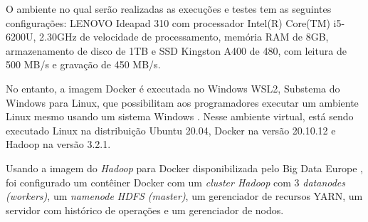 O ambiente no qual serão realizadas as execuções e testes tem as seguintes configurações: LENOVO Ideapad 310 com processador Intel(R) Core(TM) i5-6200U, 2.30GHz de velocidade de processamento,  memória RAM de 8GB, armazenamento de disco de 1TB e SSD Kingston A400 de 480, com leitura de 500 MB/s e gravação de 450 MB/s. 

No entanto, a imagem Docker é executada no Windows WSL2, Substema do Windows para Linux, que possibilitam aos programadores executar um ambiente Linux mesmo usando um sistema Windows \cite{MicrosoftWSL22}. Nesse ambiente virtual, está sendo executado Linux na distribuição Ubuntu 20.04, Docker na versão 20.10.12 e Hadoop na versão 3.2.1.

Usando a imagem do \textit{Hadoop} para Docker disponibilizada pelo Big Data Europe \cite{BigDataHadoopGithub}, foi configurado um contêiner Docker com um \textit{cluster Hadoop} com 3 \textit{datanodes (workers)}, um \textit{namenode HDFS (master)}, um gerenciador de recursos YARN, um servidor com histórico de operações e um gerenciador de nodos.
